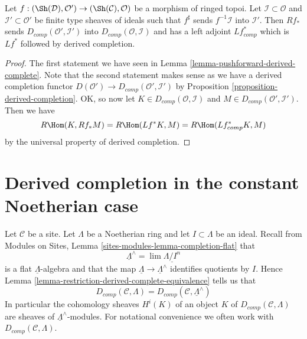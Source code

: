 \begin{lemma}
\label{lemma-pushforward-derived-complete-adjoint}
Let $f : (\Sh(\mathcal{D}), \mathcal{O}') \to (\Sh(\mathcal{C}), \mathcal{O})$
be a morphism of ringed topoi. Let $\mathcal{I} \subset \mathcal{O}$
and $\mathcal{I}' \subset \mathcal{O}'$ 
be finite type sheaves of ideals such that $f^\sharp$ sends
$f^{-1}\mathcal{I}$ into $\mathcal{I}'$.
Then $Rf_*$ sends $D_{comp}(\mathcal{O}', \mathcal{I}')$
into $D_{comp}(\mathcal{O}, \mathcal{I})$ and has a left adjoint
$Lf_{comp}^*$ which is $Lf^*$ followed by derived completion.
\end{lemma}

\begin{proof}
The first statement we have seen in
Lemma \ref{lemma-pushforward-derived-complete}.
Note that the second statement makes sense as we have a derived
completion functor $D(\mathcal{O}') \to D_{comp}(\mathcal{O}', \mathcal{I}')$
by Proposition \ref{proposition-derived-completion}.
OK, so now let $K \in D_{comp}(\mathcal{O}, \mathcal{I})$
and $M \in D_{comp}(\mathcal{O}', \mathcal{I}')$. Then we have
$$
R\Hom(K, Rf_*M) = R\Hom(Lf^*K, M) = R\Hom(Lf_{comp}^*K, M)
$$
by the universal property of derived completion.
\end{proof}







\section{Derived completion in the constant Noetherian case}
\label{section-derived-completion-noetherian}

\noindent
Let $\mathcal{C}$ be a site. Let $\Lambda$ be a Noetherian ring
and let $I \subset \Lambda$ be an ideal. Recall from
Modules on Sites, Lemma \ref{sites-modules-lemma-completion-flat}
that
$$
\underline{\Lambda}^\wedge = \lim \underline{\Lambda/I^n}
$$
is a flat $\underline{\Lambda}$-algebra and that the map
$\underline{\Lambda} \to \underline{\Lambda}^\wedge$ identifies
quotients by $I$. Hence
Lemma \ref{lemma-restriction-derived-complete-equivalence}
tells us that
$$
D_{comp}(\mathcal{C}, \Lambda) =
D_{comp}(\mathcal{C}, \underline{\Lambda}^\wedge)
$$
In particular the cohomology sheaves $H^i(K)$ of an object $K$ of
$D_{comp}(\mathcal{C}, \Lambda)$ are sheaves of
$\underline{\Lambda}^\wedge$-modules.
For notational convenience we often work with
$D_{comp}(\mathcal{C}, \Lambda)$.

